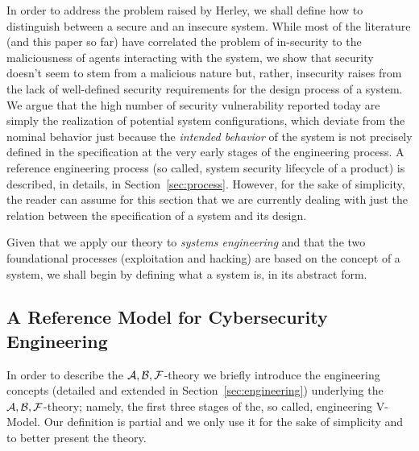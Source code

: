 In order to address the problem raised by Herley, 
we shall define how to distinguish between a secure and an insecure system.
While most of the literature (and this paper so far) have
correlated the problem of in-security to the maliciousness of
agents interacting with the system, we show that security
doesn't seem to stem from a malicious nature but, rather, insecurity 
raises from the lack of well-defined security requirements for the
design process of a system. We argue that the high number
of security vulnerability reported today are simply the realization
of potential system configurations, which deviate from the nominal
behavior just because the \emph{intended behavior} of the system is not precisely 
defined in the specification at the very early stages of the engineering process. 
A reference engineering process (so called, system security lifecycle of a product)
is described, in details, in Section~\ref{sec:process}. However,
for the sake of simplicity, the reader can assume for this section that 
we are currently dealing with just the relation between 
the specification of a system and its design.

Given that we apply our theory to \emph{systems engineering} and that
the two foundational processes (exploitation and hacking) are based on the
concept of a system, we shall begin by defining what a system is, in its
abstract form.

\subsection{A Reference Model for Cybersecurity Engineering}\label{sec:vmodel}
In order to describe the $\mathcal{A},\mathcal{B},\mathcal{F}$-theory we briefly introduce the 
engineering concepts (detailed and extended in Section~\ref{sec:engineering})
underlying the $\mathcal{A},\mathcal{B},\mathcal{F}$-theory; namely, the first three stages of the, so called,
engineering V-Model. Our definition is partial and we only use it for the 
sake of simplicity and to better present the theory.


